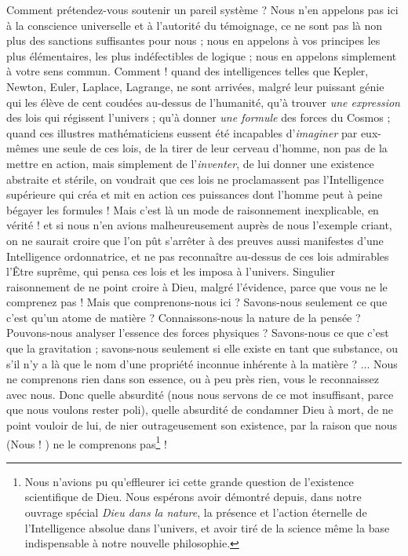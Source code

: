 \documentclass[a4paper, 11pt, oneside]{article}
\begin{document}
Comment prétendez-vous soutenir un pareil système ? Nous n'en appelons pas ici à la conscience universelle et à l'autorité du témoignage, ce ne sont pas là non plus des sanctions suffisantes pour nous ; nous en appelons à vos principes les plus élémentaires, les plus indéfectibles de logique ; nous en appelons simplement à votre sens commun. Comment ! quand des intelligences telles que Kepler, Newton, Euler, Laplace, Lagrange, ne sont arrivées, malgré leur puissant génie qui les élève de cent coudées au-dessus de l'humanité, qu'à trouver \emph{une expression} des lois qui régissent l'univers ; qu'à donner \emph{une formule} des forces du Cosmos ; quand ces illustres mathématiciens eussent été incapables d'\emph{imaginer} par eux-mêmes une seule de ces lois, de la tirer de leur cerveau d'homme, non pas de la mettre en action, mais simplement de l'\emph{inventer}, de lui donner une existence abstraite et stérile, on voudrait que ces lois ne proclamassent pas l'Intelligence supérieure qui créa et mit en action ces puissances dont l'homme peut à peine bégayer les formules ! Mais c'est là un mode de raisonnement inexplicable, en vérité ! et si nous n'en avions malheureusement auprès de nous l'exemple criant, on ne saurait croire que l'on pût s'arrêter à des preuves aussi manifestes d'une Intelligence ordonnatrice, et ne pas reconnaître au-dessus de ces lois admirables l'Être suprême, qui pensa ces lois et les imposa à l'univers. Singulier raisonnement de ne point croire à Dieu, malgré l'évidence, parce que vous ne le comprenez pas ! Mais que comprenons-nous ici ? Savons-nous seulement ce que c'est qu'un atome de matière ? Connaissons-nous la nature de la pensée ? Pouvons-nous analyser l'essence des forces physiques ? Savons-nous ce que c'est que la gravitation ; savons-nous seulement si elle existe en tant que substance, ou s'il n'y a là que le nom d'une propriété inconnue inhérente à la matière ? ... Nous ne comprenons rien dans son essence, ou à peu près rien, vous le reconnaissez avec nous. Donc quelle absurdité (nous nous servons de ce mot insuffisant, parce que nous voulons rester poli), quelle absurdité de condamner Dieu à mort, de ne point vouloir de lui, de nier outrageusement son existence, par la raison que nous (Nous ! ) ne le comprenons pas\footnote{Nous n'avions pu qu'effleurer ici cette grande question de l'existence scientifique de Dieu. Nous espérons avoir démontré depuis, dans notre ouvrage spécial \emph{Dieu dans la nature}, la présence et l'action éternelle de l'Intelligence absolue dans l'univers, et avoir tiré de la science même la base indispensable à notre nouvelle philosophie.} !
\end{document}

